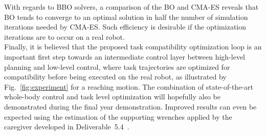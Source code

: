 \documentclass[12pt,a4paper,twoside]{article}
\begin{document}
     With regards to BBO solvers, a comparison of the BO and CMA-ES reveals that BO tends to converge to an optimal solution in half the number of simulation iterations needed by CMA-ES. Such efficiency is desirable if the optimization iterations are to occur on a real robot.\\


    Finally, it is believed that the proposed task compatibility optimization loop is an important first step towards an intermediate control layer between high-level planning and low-level control, where task trajectories are optimized for compatibility before being executed on the real robot, as illustrated by Fig.~\ref{fig:experiment} for a reaching motion. The combination of state-of-the-art whole-body control and task level optimization will hopefully also be  demonstrated during the final year demonstration. Improved results can even be expected using the estimation of the supporting wrenches applied by the caregiver developed in Deliverable~5.4~\cite{deliverable54}.
\end{document}

